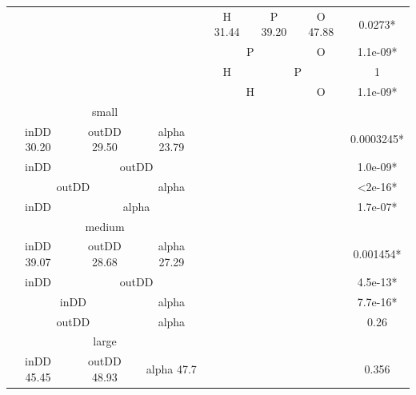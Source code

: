 \documentclass{l4proj}
\begin{document}
\begin{table}[H]
\begin{tabular}{|c|c|c|c|c|c|c|}
\multicolumn{3}{|c|}{}                    & H   31.44    & P   39.20   & O  47.88   & 0.0273*          \\ \cline{4-7} 
\multicolumn{3}{|c|}{}                    & \multicolumn{2}{c|}{P}     & O          & 1.1e-09*         \\ \cline{4-7} 
\multicolumn{3}{|c|}{}                    & H            & \multicolumn{2}{c|}{P}   & 1                \\ \cline{4-7} 
\multicolumn{3}{|c|}{}                    & \multicolumn{2}{c|}{H}     & O          & 1.1e-09*         \\ \hline
\multicolumn{3}{|c|}{small}               & \multicolumn{3}{c|}{\multirow{12}{*}{}} &                  \\ \cline{1-3} \cline{7-7} 
inDD 30.20   & outDD 29.50  & alpha 23.79 & \multicolumn{3}{c|}{}                   & 0.0003245*       \\ \cline{1-3} \cline{7-7} 
inDD         & \multicolumn{2}{c|}{outDD} & \multicolumn{3}{c|}{}                   & 1.0e-09*         \\ \cline{1-3} \cline{7-7} 
\multicolumn{2}{|c|}{outDD} & alpha       & \multicolumn{3}{c|}{}                   & \textless 2e-16* \\ \cline{1-3} \cline{7-7} 
inDD         & \multicolumn{2}{c|}{alpha} & \multicolumn{3}{c|}{}                   & 1.7e-07*         \\ \cline{1-3} \cline{7-7} 
\multicolumn{3}{|c|}{medium}              & \multicolumn{3}{c|}{}                   &                  \\ \cline{1-3} \cline{7-7} 
inDD 39.07   & outDD 28.68  & alpha 27.29 & \multicolumn{3}{c|}{}                   & 0.001454*        \\ \cline{1-3} \cline{7-7} 
inDD         & \multicolumn{2}{c|}{outDD} & \multicolumn{3}{c|}{}                   & 4.5e-13*         \\ \cline{1-3} \cline{7-7} 
\multicolumn{2}{|c|}{inDD}  & alpha       & \multicolumn{3}{c|}{}                   & 7.7e-16*         \\ \cline{1-3} \cline{7-7} 
\multicolumn{2}{|c|}{outDD} & alpha       & \multicolumn{3}{c|}{}                   & 0.26             \\ \cline{1-3} \cline{7-7} 
\multicolumn{3}{|c|}{large}               & \multicolumn{3}{c|}{}                   &                  \\ \cline{1-3} \cline{7-7} 
inDD 45.45   & outDD 48.93  & alpha 47.7  & \multicolumn{3}{c|}{}                   & 0.356            \\ \hline
\end{tabular}
\end{table}
\end{document}
